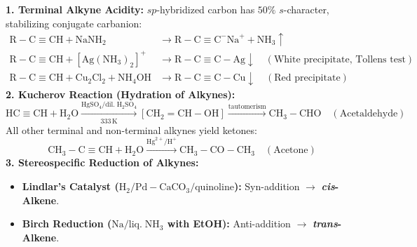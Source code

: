 \documentclass[10pt,a4paper]{article}
\begin{document}
\begin{formulabox}
\textbf{1. Terminal Alkyne Acidity:} $sp$-hybridized carbon has $50\%$ $s$-character, stabilizing conjugate carbanion:
\begin{align*}
  \mathrm{R-C\equiv CH} + \mathrm{NaNH_2} & \longrightarrow \mathrm{R-C\equiv C}^-\mathrm{Na}^+ + \mathrm{NH}_3 \uparrow\\
  \mathrm{R-C\equiv CH} + [\mathrm{Ag(NH_3)_2}]^+ & \longrightarrow \mathrm{R-C\equiv C-Ag} \downarrow \quad (\text{White precipitate, Tollens test})\\
  \mathrm{R-C\equiv CH} + \mathrm{Cu_2Cl_2 + NH_4OH} & \longrightarrow \mathrm{R-C\equiv C-Cu} \downarrow \quad (\text{Red precipitate})
\end{align*}
\textbf{2. Kucherov Reaction (Hydration of Alkynes):}
\begin{equation}
  \mathrm{HC\equiv CH} + \mathrm{H_2O} \xrightarrow[333\,\mathrm{K}]{\mathrm{HgSO_4 / dil.\; H_2SO_4}} [\mathrm{CH_2=CH-OH}] \xrightarrow{\text{tautomerism}} \mathrm{CH_3-CHO} \quad (\text{Acetaldehyde})
\end{equation}
All other terminal and non-terminal alkynes yield ketones:
\begin{equation}
  \mathrm{CH_3-C\equiv CH} + \mathrm{H_2O} \xrightarrow{\mathrm{Hg}^{2+} / \mathrm{H}^+} \mathrm{CH_3-CO-CH_3} \quad (\text{Acetone})
\end{equation}
\textbf{3. Stereospecific Reduction of Alkynes:}
\begin{itemize}
  \item \textbf{Lindlar's Catalyst ($\mathrm{H_2 / Pd-CaCO_3 / quinoline}$):} Syn-addition $\to$ \textbf{\textit{cis}-Alkene}.
  \item \textbf{Birch Reduction ($\mathrm{Na / liq.\; NH_3}$ with EtOH):} Anti-addition $\to$ \textbf{\textit{trans}-Alkene}.
\end{itemize}
\end{formulabox}
\end{document}
